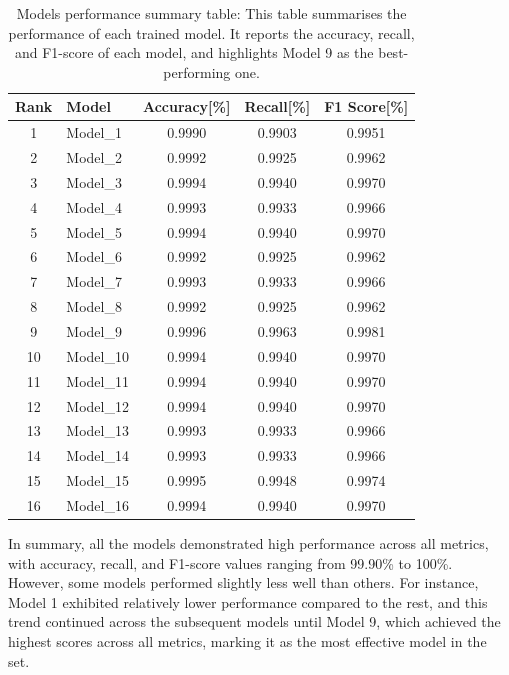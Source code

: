 \documentclass[preprint,12pt,authoryear]{elsarticle}
\begin{document}
\begin{table}[H]
\centering
\small
\begin{tabular}{|c|l|c|c|c|}
\hline
\textbf{Rank} & \textbf{Model} & \textbf{Accuracy[\%]} & \textbf{Recall[\%]} & \textbf{F1 Score[\%]} \\
\hline
1 & Model\_1 & 0.9990 & 0.9903 & 0.9951 \\
\hline
2 & Model\_2 & 0.9992 & 0.9925 & 0.9962 \\
\hline
3 & Model\_3 & 0.9994 & 0.9940 & 0.9970 \\
\hline
4 & Model\_4 & 0.9993 & 0.9933 & 0.9966 \\
\hline
5 & Model\_5 & 0.9994  & 0.9940 & 0.9970 \\
\hline
6 & Model\_6 & 0.9992  & 0.9925 & 0.9962 \\
\hline
7 & Model\_7 & 0.9993 & 0.9933 & 0.9966 \\
\hline
8 & Model\_8 & 0.9992 & 0.9925 & 0.9962 \\
\hline
9 & Model\_9 & 0.9996  & 0.9963 & 0.9981 \\
\hline
10 & Model\_10 & 0.9994 & 0.9940 & 0.9970 \\
\hline
11 & Model\_11 & 0.9994 & 0.9940 & 0.9970 \\
\hline
12 & Model\_12 & 0.9994 & 0.9940 & 0.9970 \\
\hline
13 & Model\_13 & 0.9993 & 0.9933 & 0.9966 \\
\hline
14 & Model\_14 & 0.9993 & 0.9933 & 0.9966 \\
\hline
15 & Model\_15 & 0.9995 & 0.9948 & 0.9974 \\
\hline
16 & Model\_16 & 0.9994 & 0.9940 & 0.9970 \\
\hline
\end{tabular}
\caption{Models performance summary table: This table summarises the performance of each trained model. It reports the accuracy, recall, and F1-score of each model, and highlights Model 9 as the best-performing one. }
\label{tab:model_comparison}
\end{table}

In summary, all the models demonstrated high performance across all metrics, with accuracy, recall, and F1-score values ranging from 99.90\% to 100\%. However, some models performed slightly less well than others. For instance, Model 1 exhibited relatively lower performance compared to the rest, and this trend continued across the subsequent models until Model 9, which achieved the highest scores across all metrics, marking it as the most effective model in the set.  
\end{document}
